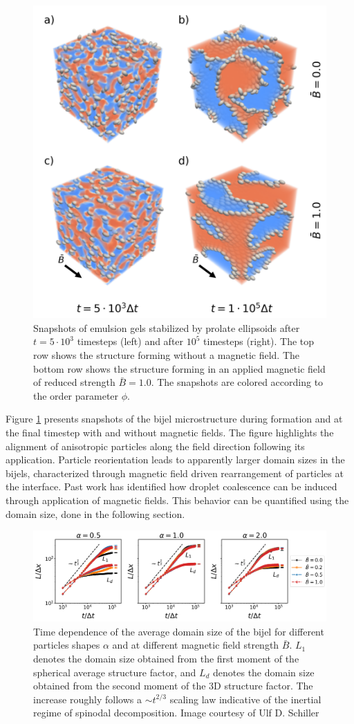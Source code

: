 \begin{figure}
    \centering
    \includegraphics[width=0.5\columnwidth]{figures/results/paper1/microstructure_viz.png}
    \caption{Snapshots of emulsion gels stabilized by prolate ellipsoids after $t=5\cdot10^3$ timesteps (left) and after $10^5$ timesteps (right). The top 
             row shows the structure forming without a magnetic field. The bottom row shows the structure forming in an applied magnetic field of reduced 
             strength $\bar{B}=1.0$. The snapshots are colored according to the order parameter $\phi$.}
    \label{fig:microstructure_viz}
\end{figure}

Figure \ref{fig:microstructure_viz} presents snapshots of the bijel microstructure during formation and at the final timestep with and without magnetic fields.
The figure highlights the alignment of anisotropic particles along the field direction following its application. Particle reorientation leads to apparently larger
domain sizes in the bijels, characterized through magnetic field driven rearrangement of particles at the interface. Past work has identified how droplet coalescence
can be induced through application of magnetic fields. \cite{melle_pickering_2005} This behavior can be quantified using the domain size, done in the following section.

\begin{figure}
    \centering
    \includegraphics[width=\textwidth]{figures/results/paper1/domain_size.png}
    \caption{Time dependence of the average domain size of the bijel for different particles shapes $\alpha$ and at different magnetic 
             field strength $\bar{B}$. $L_1$ denotes the domain size obtained from the first moment of the spherical average structure 
             factor, and $L_d$ denotes the domain size obtained from the second moment of the 3D structure factor. The increase roughly 
             follows a $\sim t^{2/3}$ scaling law indicative of the inertial regime of spinodal decomposition. Image courtesy of Ulf D. Schiller}
    \label{fig:domain_size}
\end{figure}

